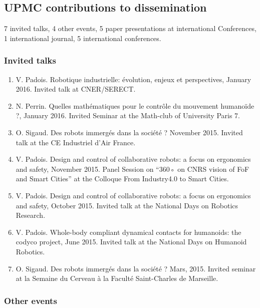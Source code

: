 \subsection{UPMC contributions to dissemination}

7 invited talks, 4 other events, 5 paper presentations at international Conferences, 1 international journal, 5 international conferences.

\subsubsection{Invited talks}

\begin{enumerate}

\item  V. Padois. Robotique industrielle: évolution, enjeux et perspectives, January 2016. Invited talk at CNER/SERECT.

\item N. Perrin. Quelles mathématiques pour le contrôle du mouvement humanoïde ?, January 2016. Invited Seminar at the Math-club of University Paris 7.

\item O. Sigaud. Des robots immergés dans la société ? November 2015. Invited talk at the CE Industriel d’Air France.

\item V. Padois. Design and control of collaborative robots: a focus on ergonomics and safety, November 2015. Panel Session on ``360◦ on CNRS vision of FoF and Smart Cities'' at the Colloque From Industry4.0 to Smart Cities.

\item V. Padois. Design and control of collaborative robots: a focus on ergonomics and safety, October 2015. Invited talk at the National Days on Robotics Research.

\item V. Padois. Whole-body compliant dynamical contacts for humanoids: the codyco project, June 2015. Invited talk at the National Days on Humanoid Robotics.

\item O. Sigaud.  Des robots immergés dans la société ? Mars, 2015. Invited seminar at la Semaine du Cerveau à la Faculté Saint-Charles de Marseille.
\end{enumerate}

\subsubsection{Other events}

